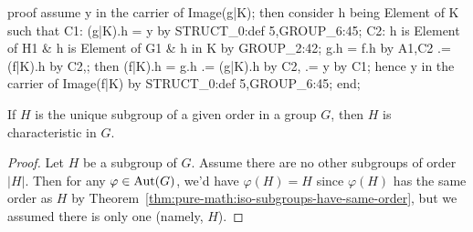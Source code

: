 \nwenddocs{}\endmoddef\nwstartdeflinemarkup{}\nwenddeflinemarkup
proof
  assume y in the carrier of Image(g|K);
  then consider h being Element of K such that
  C1: (g|K).h = y
  by STRUCT_0:def 5,GROUP_6:45;
  C2: h is Element of H1 & h is Element of G1 & h in K by GROUP_2:42;
  g.h = f.h by A1,C2
     .= (f|K).h by C2,;
  then (f|K).h = g.h
              .= (g|K).h by C2,
              .= y by C1;
  hence y in the carrier of Image(f|K) by STRUCT_0:def 5,GROUP_6:45;
end;
\nwendcode{}\nwdocspar


\begin{theorem}
  If $H$ is the unique subgroup of a given order in a group $G$,
  then $H$ is characteristic in $G$.
\end{theorem}

\begin{proof}
Let $H$ be a subgroup of $G$. Assume there are no other subgroups of
order $|H|$. Then for any $\varphi\in\operatorname{Aut}(G)$, we'd have $\varphi(H)=H$
since $\varphi(H)$ has the same order as $H$ by
Theorem~\ref{thm:pure-math:iso-subgroups-have-same-order}, but we
assumed there is only one (namely, $H$).
\end{proof}

